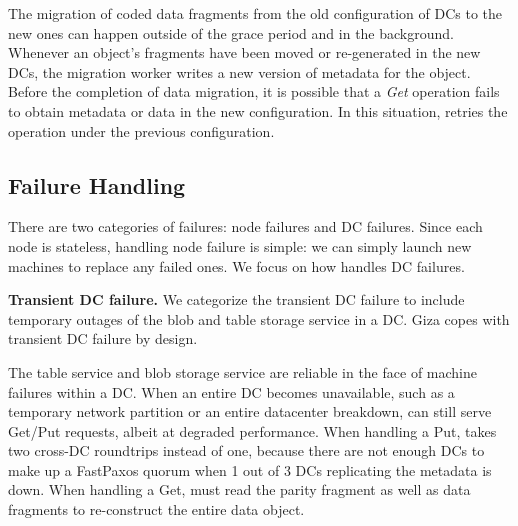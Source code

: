 The migration of coded data fragments from the old configuration of DCs to the
new ones can happen outside of the grace period and in the background. Whenever
an object's fragments have been moved or re-generated in the new DCs, the
migration worker writes a new version of metadata for the object.
Before the completion of data migration, it is possible that a {\em Get} operation 
fails to obtain metadata or data in the new configuration.  In this situation, 
{\name} retries the operation under the previous configuration.


\subsection{Failure Handling}

There are two categories of failures: {\name} node failures and DC failures.
Since each \name node is stateless, handling node failure is simple: we can
simply launch new machines to replace any failed ones.  We focus on how \name
handles DC failures.

{\bf Transient DC failure.}
We categorize the transient DC failure to include temporary outages of the blob
and table storage service in a DC.  Giza copes with transient DC failure by
design.


The table service and blob storage service are reliable in the face of machine
failures within a DC.  When an entire DC becomes unavailable, such as a
temporary network partition or an entire datacenter breakdown, {\name} can
still serve Get/Put requests, albeit at degraded performance. When handling a Put, 
\name takes two cross-DC roundtrips instead of one,
because there are not enough DCs to make up a FastPaxos quorum when 1 out of 3 DCs
replicating the metadata is down.  When handling a Get, \name must read the parity 
fragment as well as data fragments to re-construct the entire data object.

